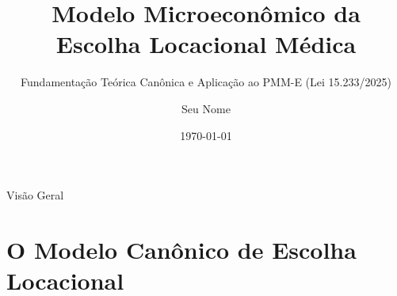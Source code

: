 \documentclass[aspectratio=169, 10pt]{beamer}
\title[Modelo Microeconômico Locacional]{Modelo Microeconômico da Escolha Locacional Médica}
\subtitle{Fundamentação Teórica Canônica e Aplicação ao PMM-E (Lei 15.233/2025)}
\author[Economia da Saúde]{Seu Nome}
\institute[Insper]{Insper Instituto de Ensino e Pesquisa}
\date{\today}
\begin{document}
\begin{frame}
  \titlepage
\end{frame}

\begin{frame}{Visão Geral}
  \tableofcontents
\end{frame}

\section{O Modelo Canônico de Escolha Locacional}
\end{document}
